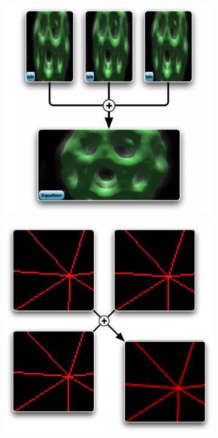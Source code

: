 \documentclass[10pt,journal,compsoc]{IEEEtran}
\begin{document}
\begin{figure}[ht]
\begin{subfigure}[b]{0.24\textwidth}
  \end{subfigure}
  \begin{subfigure}[b]{0.24\textwidth}
    \includegraphics[width=\textwidth]{images/pixel}
  \end{subfigure}
  \begin{subfigure}[b]{0.24\textwidth}
    \includegraphics[width=\textwidth]{images/subpixel}

\end{subfigure}
\end{figure}
\end{document}
